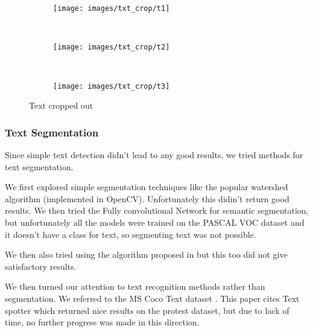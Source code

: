 \documentclass{article}
\begin{document}
\begin{figure}[H]
  \centering
  \begin{subfigure}[H]{0.1\linewidth}
    \texttt{[image: images/txt\_crop/t1]}
    \caption{}
    \label{fig:t1}
  \end{subfigure}
  ~
  \begin{subfigure}[H]{0.1\linewidth}
    \texttt{[image: images/txt\_crop/t2]}
    \caption{}
    \label{fig:t2}
  \end{subfigure}
  ~
  \begin{subfigure}[H]{0.1\linewidth}
    \texttt{[image: images/txt\_crop/t3]}
    \caption{}
    \label{fig:t3}
  \end{subfigure}
  \caption{Text cropped out}
  \label{fig:txt_l}
\end{figure}

\subsubsection{Text Segmentation}
Since simple text detection didn't lead to any good results, we tried methods for text segmentation.

We first explored simple segmentation techniques like the popular watershed algorithm (implemented in OpenCV)\cite{opecv}. Unfortunately this didin't return good results. We then tried the Fully convolutional Network for semantic segmentation\cite{Long_2015_CVPR}, but unfortunately all the models were trained on the PASCAL VOC dataset \cite{Everingham10} and it doesn't have a class for text, so segmenting text was not possible.

We then also tried using the algorithm proposed in \cite{Felzenszwalb:2004:EGI:981793.981796} but this too did not give satisfactory results.

We then turned our attention to text recognition methods rather than segmentation. We referred to the MS Coco Text dataset \cite{veit2016cocotext}. This paper cites Text spotter\cite{Gupta16} which returned nice results on the protest dataset, but due to lack of time, no further progress was made in this direction.






\end{document}
